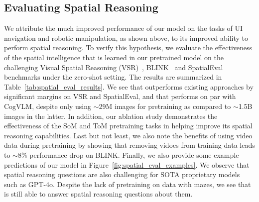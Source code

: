 \subsection{Evaluating Spatial Reasoning}
We attribute the much improved performance of our \magma model on the tasks of UI navigation and robotic manipulation, as shown above, to its improved ability to perform spatial reasoning. To verify this hypothesis, we evaluate the effectiveness of the spatial intelligence that is learned in our pretrained model on the challenging Visual Spatial Reasoning (VSR)~\cite{liu2023visual}, BLINK~\cite{fu2024blink} and SpatialEval~\cite{wang2024picture} benchmarks under the zero-shot setting. The results are summarized in Table~\ref{tab:spatial_eval_results}. We see that \magma outperforms existing approaches by significant margins on VSR and SpatialEval, and that \magma performs on par with CogVLM, despite only using $\sim$29M images for pretraining as compared to $\sim$1.5B images in the latter. In addition, our ablation study demonstrates the effectiveness of the SoM and ToM pretraining tasks in helping \magma improve its spatial reasoning capabilities. Last but not least, we also note the benefits of using video data during pretraining by showing that removing vidoes from training data leads to $\sim$8\% performance drop on BLINK. Finally, we also provide some example predictions of our \magma model in Figure~\ref{fig:spatial_eval_examples}. We observe that spatial reasoning questions are also challenging for SOTA proprietary models such as GPT-4o. Despite the lack of pretraining on data with mazes, we see that \magma is still able to answer spatial reasoning questions about them. 

